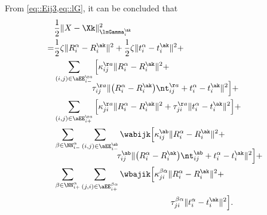 From \cref{eq::Eij3,eq::lG}, it can be concluded that
\begingroup
\allowdisplaybreaks
\begin{align}\label{eq::lnGammai}
&\frac{1}{2}\|X-\Xk\|_{\lnGamma_i^\ak}^2\nonumber\\
=&\frac{1}{2}\zeta\|R_i^\alpha-R_i^{\ak}\|^2 + \frac{1}{2}\zeta\|t_i^\alpha-t_i^{\ak}\|^2+\nonumber\\
&\sum_{(i,j)\in\aEE_{i-}^{\aa}}\Big[\kappa_{ij}^{\aa}\|R_i^\alpha-R_i^{\ak}\|^2+\nonumber\\[-0.75em]
&\quad\quad\quad\quad\;\;\tau_{ij}^{\aa}\|\big(R_i^\alpha-R_i^{\ak}\big) \nt_{ij}^{\aa}+t_i^\alpha-t_i^{\ak}\|^2\Big]+\nonumber\\
&\sum_{(i,j)\in \aEE_{i+}^{\aa}}\Big[\kappa_{ji}^{\aa}\|R_i^\alpha -R_{i}^{\ak}\|^2+\tau_{ji}^{\aa}\|t_i^\alpha - t_{i}^{\ak}\|^2\Big]+\nonumber\\
&\sum_{\substack{\beta\in \NN_{i-}^\alpha}}\sum_{(i,j)\in \aEE_{i-}^{\ab}}\wabijk\Big[\kappa_{ij}^{\ab}\|R_i^\alpha-R_i^{\ak}\|^2 +\nonumber\\[-0.75em]
&\quad\quad\quad\quad\quad\quad\quad\;\;\tau_{ij}^{\ab}\|\big(R_i^\alpha-R_i^{\ak}\big) \nt_{ij}^{\ab}+t_i^\alpha-t_i^{\ak}\|^2\Big]+\nonumber\\
&\sum_{\substack{\beta\in \NN_{i+}^\alpha}}\sum_{(j,i)\in \aEE_{i+}^{\beta\alpha}}\wbajik\Big[\kappa_{ji}^{\beta\alpha}\|R_i^\alpha -R_{i}^{\ak}\|^2+\nonumber\\
&\quad\quad\quad\quad\hspace{10em}\tau_{ji}^{\beta\alpha}\|t_i^\alpha - t_{i}^{\ak}\|^2\Big].
\end{align}
\endgroup


